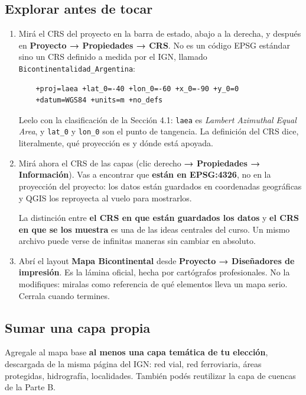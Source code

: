 \documentclass{article}
\begin{document}
\subsection{Explorar antes de tocar}

\begin{enumerate}
    \item Mirá el CRS del proyecto en la barra de estado, abajo a la derecha, y después en \textbf{Proyecto → Propiedades → CRS}. No es un código EPSG estándar sino un CRS definido a medida por el IGN, llamado \texttt{Bicontinentalidad\_Argentina}:
    \begin{verbatim}
    +proj=laea +lat_0=-40 +lon_0=-60 +x_0=-90 +y_0=0
    +datum=WGS84 +units=m +no_defs
    \end{verbatim}
    Leelo con la clasificación de la Sección 4.1: \texttt{laea} es \textit{Lambert Azimuthal Equal Area}, y \texttt{lat\_0} y \texttt{lon\_0} son el punto de tangencia. La definición del CRS dice, literalmente, qué proyección es y dónde está apoyada.

    \item Mirá ahora el CRS de las capas (clic derecho \textbf{→ Propiedades → Información}). Vas a encontrar que \textbf{están en EPSG:4326}, no en la proyección del proyecto: los datos están guardados en coordenadas geográficas y QGIS los reproyecta al vuelo para mostrarlos.

    La distinción entre \textbf{el CRS en que están guardados los datos} y \textbf{el CRS en que se los muestra} es una de las ideas centrales del curso. Un mismo archivo puede verse de infinitas maneras sin cambiar en absoluto.

    \item Abrí el layout \textbf{Mapa Bicontinental} desde \textbf{Proyecto → Diseñadores de impresión}. Es la lámina oficial, hecha por cartógrafos profesionales. No la modifiques: miralas como referencia de qué elementos lleva un mapa serio. Cerrala cuando termines.
\end{enumerate}

\subsection{Sumar una capa propia}

Agregale al mapa base \textbf{al menos una capa temática de tu elección}, descargada de la misma página del IGN: red vial, red ferroviaria, áreas protegidas, hidrografía, localidades. También podés reutilizar la capa de cuencas de la Parte B.
\end{document}
